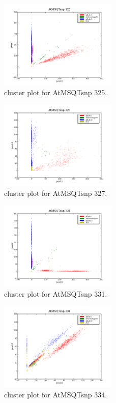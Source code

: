 \begin{figure}[H]
\includegraphics[width=0.5\textwidth]{figures/cluster_plot_AtMSQTsnp_325.png}
\caption{cluster plot for AtMSQTsnp 325.} \label{flAtMSQTsnp325}
\end{figure}

\begin{figure}[H]
\includegraphics[width=0.5\textwidth]{figures/cluster_plot_AtMSQTsnp_327.png}
\caption{cluster plot for AtMSQTsnp 327.} \label{flAtMSQTsnp327}
\end{figure}

\begin{figure}[H]
\includegraphics[width=0.5\textwidth]{figures/cluster_plot_AtMSQTsnp_331.png}
\caption{cluster plot for AtMSQTsnp 331.} \label{flAtMSQTsnp331}
\end{figure}

\begin{figure}[H]
\includegraphics[width=0.5\textwidth]{figures/cluster_plot_AtMSQTsnp_334.png}
\caption{cluster plot for AtMSQTsnp 334.} \label{flAtMSQTsnp334}
\end{figure}

